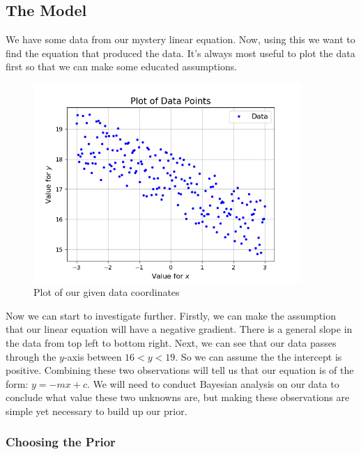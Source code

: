 \documentclass[11pt]{article}   %
\begin{document}
\subsection{The Model}\label{The Model2}

We have some data from our mystery linear equation. Now, using this we want to find the equation that produced the data. It's always most useful to plot the data first so that we can make some educated assumptions.
\begin{figure}[h]
\centering
\includegraphics[width = 4in]{Data.png}
\caption{Plot of our given data coordinates}
\label{figLinearData}
\end{figure}

Now we can start to investigate further. Firstly, we can make the assumption that our linear equation will have a negative gradient. There is a general slope in the data from top left to bottom right. Next, we can see  that our data passes through the $y$-axis between $16< y< 19$. So we can assume the the intercept is positive. Combining these two observations will tell us that our equation is of the form: $y = -mx + c$. We will need to conduct Bayesian analysis on our data to conclude what value these two unknowns are, but making these observations are simple yet necessary to build up our prior.

\subsubsection{Choosing the Prior}\label{Choosing the Prior2}
\end{document}
